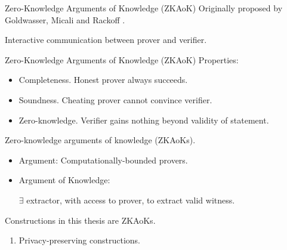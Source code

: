 \begin{frame}{Zero-Knowledge Arguments of Knowledge (ZKAoK)}
	Originally proposed by Goldwasser, Micali and Rackoff \cite{GoldwasserMR85}.\pause
	
	Interactive communication between prover and verifier.\pause
	
\end{frame} 
\begin{frame}{Zero-Knowledge Arguments of Knowledge (ZKAoK)}
	Properties:\pause
	\begin{itemize}
		\item {\small Completeness. Honest prover always succeeds.}\pause
		\item {\small Soundness. Cheating prover cannot convince verifier.}\pause
		\item {\small Zero-knowledge. Verifier gains nothing beyond validity of statement.}\pause
	\end{itemize}
	Zero-knowledge arguments of knowledge (ZKAoKs).\pause
	\begin{itemize}
		\item Argument: Computationally-bounded provers.\pause
		\item Argument of Knowledge: 
		
		$\exists$ extractor, with access to prover, to extract valid witness.\pause
	\end{itemize}

	Constructions in this thesis are ZKAoKs.\pause
	\begin{enumerate}[$\Rightarrow$]
		\item Privacy-preserving constructions.
	\end{enumerate}
\end{frame}